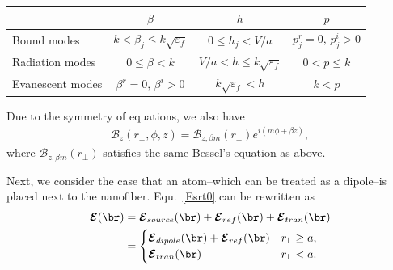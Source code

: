 \documentclass[]{report}
\begin{document}
\begin{minipage}{\linewidth}
\centering
{} \label{tab:fiberparameters} 
\begin{tabular}{|l|c|c|c|}
\hline  & $\beta$ & $h$ & $p$ \\ 
\hline Bound modes & $k<\beta_j \leq k\sqrt{\varepsilon_f} $ & $ 0\leq h_j<V/a $ & $ p^r_j=0,\, p^i_j>0 $ \\ 
\hline Radiation modes & $0\leq \beta<k$ & $V/a < h\leq k\sqrt{\varepsilon_f}$ & $0<p\leq k $\\ 
\hline Evanescent modes & $ \beta^r=0,\, \beta^i>0 $ & $ k\sqrt{\varepsilon_f} < h $ & $ k<p $ \\ 
\hline 
\end{tabular} 
\par
\bigskip
\end{minipage}

Due to the symmetry of equations, we also have
\begin{align}
\mathcal{B}_z(r\!_\perp,\phi,z) = \mathcal{B}_{z,\beta m}(r\!_\perp)e^{i(m\phi+\beta z)},
\end{align}
where $  \mathcal{B}_{z,\beta m}(r\!_\perp) $ satisfies the same Bessel's equation as above. 

Next, we consider the case that an atom--which can be treated as a dipole--is placed next to the 
nanofiber. Equ.~\ref{Esrt0} can be rewritten as 
\begin{align}
\boldsymbol{\mathcal{E}}(\br) &= \boldsymbol{\mathcal{E}}_{source}(\br) + 
\boldsymbol{\mathcal{E}}_{ref}(\br)+\boldsymbol{\mathcal{E}}_{tran}(\br)\\
&=
	\begin{cases}
	  \boldsymbol{\mathcal{E}}_{dipole} (\br)+ \boldsymbol{\mathcal{E}}_{ref}(\br) & r\!_\perp \geq a,\\
	  \boldsymbol{\mathcal{E}}_{tran}(\br) & r\!_\perp<a.
	\end{cases} \label{Etotalfiber}
\end{align}
\end{document}

